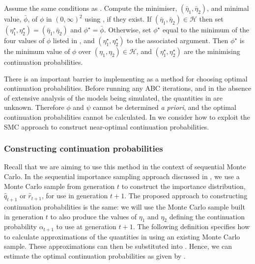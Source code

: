 \documentclass[review,demo]{siamonline190516}
\begin{document}
\begin{proposition}
\label{etastar}
 Assume the same conditions as . 
 Compute the minimiser, $(\bar \eta_1, \bar \eta_2)$, and minimal value, $\bar \phi$, of $\phi$ in $(0,\infty)^2$ using , if they exist.
 If $(\bar \eta_1, \bar \eta_2) \in \mathcal H$ then set $(\eta_1^\star, \eta_2^\star) = (\bar \eta_1, \bar \eta_2)$ and $\phi^\star = \bar \phi$. 
 Otherwise, set $\phi^\star$ equal to the minimum of the four values of $\phi$ listed in , and $(\eta_1^\star, \eta_2^\star)$ to the associated argument.
Then $\phi^\star$ is the minimum value of $\phi$ over $(\eta_1, \eta_2) \in \mathcal H$, and $(\eta_1^\star, \eta_2^\star)$ are the minimising continuation probabilities.
\end{proposition}

There is an important barrier to implementing  as a method for choosing optimal continuation probabilities.
Before running any ABC iterations, and in the absence of extensive analysis of the models being simulated, the quantities in  are unknown.
Therefore $\phi$ and $\psi$ cannot be determined \emph{a priori}, and the optimal continuation probabilities cannot be calculated.
In  we consider how to exploit the SMC approach to construct near-optimal continuation probabilities. 

\subsubsection{Constructing continuation probabilities}
\label{s:eta:MC}

Recall that we are aiming to use this method in the context of sequential Monte Carlo.
In the sequential importance sampling approach discussed in , we use a Monte Carlo sample from generation $t$ to construct the importance distribution, $\hat q_{t+1}$ or $\hat r_{t+1}$, for use in generation $t+1$.
The proposed approach to constructing continuation probabilities is the same: we will use the Monte Carlo sample built in generation $t$ to also produce the values of $\eta_1$ and $\eta_2$ defining the continuation probability $\alpha_{t+1}$ to use at generation $t+1$.
The following definition specifies how to calculate approximations of the quantities in  using an existing Monte Carlo sample.
These approximations can then be substituted into .
Hence, we can estimate the optimal continuation probabilities as given by .
\end{document}
